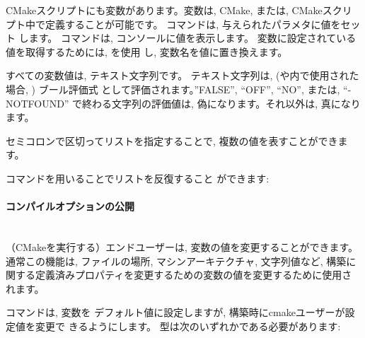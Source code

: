 \documentclass[uplatex,11pt,a4paper,landscape,dvipdfmx]{jsarticle} %
\newcommand{\sectiontitle}[1]{\paragraph{#1} \ \\} %
\begin{document}
\begin{multicols}{2}
CMakeスクリプトにも変数があります。変数は, CMake, または, CMakeスクリ
プト中で定義することが可能です。
 コマンドは, 与えられたパラメタに値をセット
します。
コマンドは, コンソールに値を表示します。
変数に設定されている値を取得するためには, を使用
し, 変数名を値に置き換えます。



すべての変数値は, テキスト文字列です。 テキスト文字列は,
(や内で使用された場合, ) ブール評価式
として評価されます。''FALSE'', ``OFF'', ``NO'', または, ``-NOTFOUND''
で終わる文字列の評価値は, 偽になります。それ以外は, 真になります。

セミコロンで区切ってリストを指定することで, 複数の値を表すことができま
す。



コマンドを用いることでリストを反復すること
ができます:

			
\sectiontitle{コンパイルオプションの公開}
			

（CMakeを実行する）エンドユーザーは, 変数の値を変更することができます。
通常この機能は, ファイルの場所, マシンアーキテクチャ, 文字列値など, 構築に
関する定義済みプロパティを変更するための変数の値を変更するために使用さ
れます。

コマンドは, 変数を
デフォルト値に設定しますが, 構築時にcmakeユーザーが設定値を変更で
きるようにします。
型は次のいずれかである必要があります:


\end{multicols}
\end{document}
